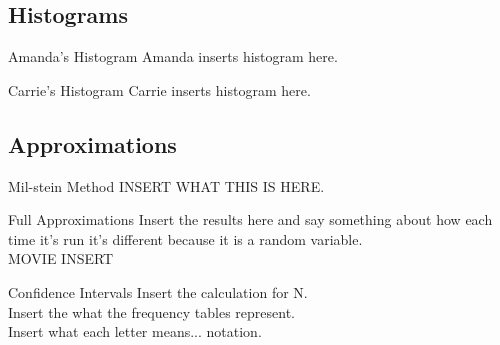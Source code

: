 
\subsection{Histograms}

\begin{frame}{Amanda's Histogram}
Amanda inserts histogram here. 
\end{frame}

\begin{frame}{Carrie's Histogram}
Carrie inserts histogram here. 
\end{frame}



\subsection{Approximations}

\begin{frame}{Mil-stein Method}
INSERT WHAT THIS IS HERE.
\end{frame}

\begin{frame}{Full Approximations}
Insert the results here and say something about how each time it's run it's different because it is a random variable. \\
MOVIE INSERT 
\end{frame}

\begin{frame}{Confidence Intervals}
Insert the calculation for N. \\
Insert the what the frequency tables represent.\\
Insert what each letter means... notation.\\ 
\end{frame}



